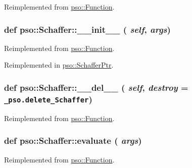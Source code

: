 Reimplemented from \hyperlink{classpso_1_1Function_959f07a6de4f333461fdb0261e6c25ae}{pso::Function}.\hypertarget{classpso_1_1Schaffer_ff9f1ae937ff0d73aeb17bb27be9b5f3}{
\subsubsection{\setlength{\rightskip}{0pt plus 5cm}def pso::Schaffer::\_\-\_\-init\_\-\_\- ( {\em self}, \/   {\em args})}}
\label{classpso_1_1Schaffer_ff9f1ae937ff0d73aeb17bb27be9b5f3}




Reimplemented from \hyperlink{classpso_1_1Function_6874097c6476dc85af64b40e76a807e9}{pso::Function}.

Reimplemented in \hyperlink{classpso_1_1SchafferPtr_ed11725f1cd7627f537b7daad5560125}{pso::SchafferPtr}.\hypertarget{classpso_1_1Schaffer_a8c2032038b61e7a1f61f45ba0f86ccd}{
\subsubsection{\setlength{\rightskip}{0pt plus 5cm}def pso::Schaffer::\_\-\_\-del\_\-\_\- ( {\em self}, \/   {\em destroy} = {\tt \_\-pso.delete\_\-Schaffer})}}
\label{classpso_1_1Schaffer_a8c2032038b61e7a1f61f45ba0f86ccd}




Reimplemented from \hyperlink{classpso_1_1Function_c80bd40fcf4a956e5732ed099bccc598}{pso::Function}.\hypertarget{classpso_1_1Schaffer_575dd83cea9a359e9233918331ef4ada}{
\subsubsection{\setlength{\rightskip}{0pt plus 5cm}def pso::Schaffer::evaluate ( {\em args})}}
\label{classpso_1_1Schaffer_575dd83cea9a359e9233918331ef4ada}




Reimplemented from \hyperlink{classpso_1_1Function_7c958ea6d942a89ae219b872b4d73541}{pso::Function}.

